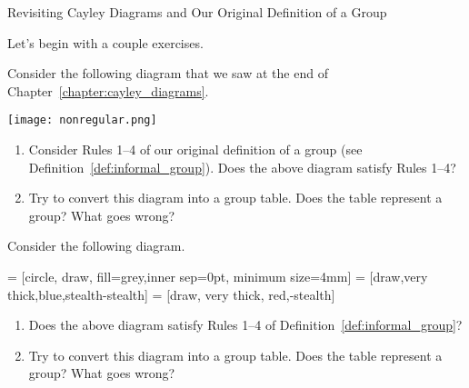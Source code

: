 \begin{section}{Revisiting Cayley Diagrams and Our Original Definition of a Group}%

Let's begin with a couple exercises.

\begin{exercise}\label{exer:nonregular1}%
Consider the following diagram that we saw at the end of Chapter~\ref{chapter:cayley_diagrams}.
\begin{center}
\texttt{[image: nonregular.png]}
\end{center}
\begin{enumerate}
\item[(a)] Consider Rules 1--4 of our original definition of a group (see Definition~\ref{def:informal_group}).  Does the above diagram satisfy Rules 1--4?
\item[(b)] Try to convert this diagram into a group table.  Does the table represent a group? What goes wrong?
\end{enumerate}
\end{exercise}

\begin{exercise}\label{exer:nonregular2}%
Consider the following diagram.

 = [circle, draw, fill=grey,inner sep=0pt, minimum size=4mm]
 = [draw,very thick,blue,stealth-stealth]
 = [draw, very thick, red,-stealth]

\begin{center}
\end{center}
\begin{enumerate}
\item[(a)] Does the above diagram satisfy Rules 1--4 of Definition~\ref{def:informal_group}?
\item[(b)] Try to convert this diagram into a group table.  Does the table represent a group? What goes wrong?
\end{enumerate}
\end{exercise}


\end{section}

